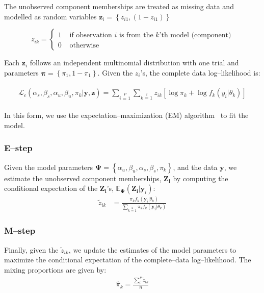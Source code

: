 \documentclass[11pt]{article}
\begin{document}
The unobserved component memberships are treated as missing data and modelled as random variables  $\mathbf{z}_i = \left\{z_{i1},(1-z_{i1})\right\}$

$$
z_{ik} = \left\{ \begin{array}{rl}
1 &\mbox{ if observation $i$ is from the $k$'th model (component)} \\
0&\mbox{ otherwise}
\end{array} \right.
$$

Each $\mathbf{z}_{i}$ follows an independent multinomial distribution with one trial and  parameters $\boldsymbol{\pi}=\left\{\pi_1,1-\pi_1\right\}$. Given the $z_i$'s, the complete data log--likelihood is:

\begin{align}
\begin{split}
\mathcal{L}_c(\alpha_s,\beta_s,\alpha_u,\beta_u,\pi_k|\mathbf{y},\mathbf{z})=\sum\limits_{i=1}\limits^P\sum\limits_{k=1}\limits^2{z_{ik}\left[ \log\pi_k+\log f_k(y_i|\theta_k)\right]}\label{eq:CDLL}
\end{split}
\end{align}

In this form, we use the expectation--maximization (EM) algorithm~\cite{Dempster:1977ul} to fit the model. 

\subsubsection*{E--step}
Given the model parameters $\boldsymbol{\Psi}=\left\{\alpha_u,\beta_u,\alpha_s,\beta_s,\pi_k\right\}$, and the data $\mathbf{y}$, we estimate the unobserved component memberships, $\mathbf{Z_i}$  by computing the conditional expectation of the $\mathbf{Z_i}$'s,  $\mathbb{E}\boldsymbol{_\Psi}(\mathbf{Z_i}|\mathbf{y}_i)$:
\begin{align}
\tilde z_{ik} &= \frac{\pi_k f_k(\mathbf{y}_i|\theta_k)}{\sum\limits_{k=1}\limits^{2}\pi_kf_k(\mathbf{y}_i|\theta_k)}
\end{align}

\subsubsection*{M--step}
Finally, given the $\tilde{z}_{ik}$, we update the estimates of the model parameters to maximize the conditional expectation of the complete--data log--likelihood. The mixing proportions are given by:
\begin{align}
\hat\pi_k = \frac{ \sum_i^P \tilde z_{ik}}{n}
\end{align}
\end{document}
